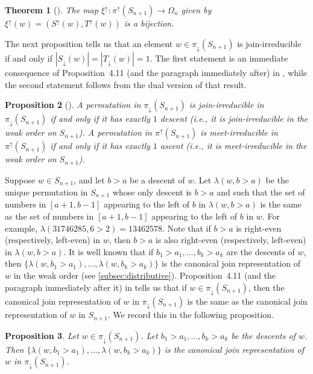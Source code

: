 \documentclass[11pt]{amsart}
\newtheorem{theorem}{Theorem}[section]
\newtheorem{proposition}[theorem]{Proposition}
\theoremstyle{definition}
\begin{document}
\begin{theorem}[{\cite{BarnardReading}}]
The map $\xi^\uparrow\colon\pi^\uparrow(S_{n+1})\to\Omega_n$ given by $\xi^\uparrow(w)=(S^\uparrow(w),T^\uparrow(w))$ is a bijection. 
\end{theorem}

The next proposition tells us that an element $w\in\pi_\downarrow(S_{n+1})$ is join-irreducible if and only if $|S_\downarrow(w)|=|T_\downarrow(w)|=1$. The first statement is an immediate consequence of Proposition~4.11 (and the paragraph immediately after) in \cite{BarnardReading}, while the second statement follows from the dual version of that result. 

\begin{proposition}[{\cite[Proposition~4.11]{BarnardReading}}]\label{prop:1descent}
A permutation in $\pi_\downarrow(S_{n+1})$ is join-irreducible in $\pi_\downarrow(S_{n+1})$ if and only if it has exactly $1$ descent (i.e., it is join-irreducible in the weak order on $S_{n+1}$). A permutation in $\pi^\uparrow(S_{n+1})$ is meet-irreducible in $\pi^\uparrow(S_{n+1})$ if and only if it has exactly $1$ ascent (i.e., it is meet-irreducible in the weak order on $S_{n+1}$).
\end{proposition}

Suppose $w\in S_{n+1}$, and let $b>a$ be a descent of $w$. Let $\lambda(w,b>a)$ be the unique permutation in $S_{n+1}$ whose only descent is $b>a$ and such that the set of numbers in $[a+1,b-1]$ appearing to the left of $b$ in $\lambda(w,b>a)$ is the same as the set of numbers in $[a+1,b-1]$ appearing to the left of $b$ in $w$. For example, $\lambda(31746285,6>2)=13462578$. Note that if $b>a$ is right-even (respectively, left-even) in $w$, then $b>a$ is also right-even (respectively, left-even) in $\lambda(w,b>a)$. It is well known that if $b_1>a_1,\ldots,b_k>a_k$ are the descents of $w$, then $\{\lambda(w,b_1>a_1),\ldots,\lambda(w,b_k>a_k)\}$ is the canonical join representation of $w$ in the weak order (see \cref{subsec:distributive}). Proposition~4.11 (and the paragraph immediately after it) in \cite{BarnardReading} tells us that if $w\in\pi_\downarrow(S_{n+1})$, then the canonical join representation of $w$ in $\pi_\downarrow(S_{n+1})$ is the same as the canonical join representation of $w$ in $S_{n+1}$. We record this in the following proposition. 

\begin{proposition}\label{prop:canonicaljoinpidown}
Let $w\in\pi_\downarrow(S_{n+1})$. Let $b_1>a_1,\ldots,b_k>a_k$ be the descents of $w$. Then $\{\lambda(w,b_1>a_1),\ldots,\lambda(w,b_k>a_k)\}$ is the canonical join representation of $w$ in $\pi_\downarrow(S_{n+1})$.
\end{proposition}
\end{document}
